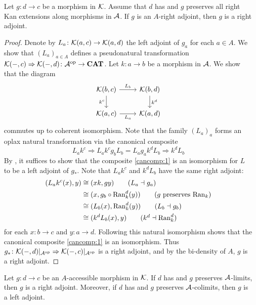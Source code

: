 \begin{theorem}\label{thm:LiftingOfAdjoint}
     Let $g\colon d\to c$ be a morphism in $\mathcal{K}$. Assume that $d$ has and $g$ preserves all right Kan extensions along morphisms in $\mathcal{A}$. If $g$ is an $A$-right adjoint, then $g$ is a right adjoint.
\end{theorem}
\begin{proof}
    Denote by $L_a\colon \mathcal{K}(a,c)\to \mathcal{K}(a,d)$ the left adjoint of $g_a$ for each $a\in A$. We show that $(L_a)_{a\in A}$ defines a pseudonatural transformation $\mathcal{K}(-,c)\Rightarrow \mathcal{K}(-,d)\colon \mathcal{A}^{\mathrm{op}}\to \mathbf{CAT}$. Let $k\colon a\to b$ be a morphism in $\mathcal{A}$. We show that the diagram
\[
\begin{tikzcd}
{\K(b,c)} \arrow[d, "k^c"'] \arrow[r, "L_b"] & {\K(b,d)} \arrow[d, "k^d"] \\
{\K(a,c)} \arrow[r, "L_a"']                  & {\K(a,d)}
\end{tikzcd}
\]
commutes up to coherent isomorphism. Note that the family $(L_a)_a$ forms an oplax natural transformation via the canonical composite
\begin{equation}\label{cancomp:1}
L_ak^c\Rightarrow L_ak^cg_bL_b = L_ag_ak^dL_b\Rightarrow k^dL_b
\end{equation}
By \cite[Proposition~2.35]{houstonLinearLogicUnits2013}, it suffices to show that the composite \eqref{cancomp:1} is an isomorphism for $L$ to be a left adjoint of $g_*$. Note that $L_ak^c$ and $k^dL_b$ have the same right adjoint:
\begin{align*}
    (L_ak^c(x),y) &\cong (xk,gy)\tag{$L_a\dashv g_a$}\\
    &\cong (x, g_b\circ \Ran_k^d(y))\tag{$g$ preserves $\Ran_k$}\\
    &\cong (L_b(x),\Ran_k^d(y)) \tag{$L_b\dashv g_b$}\\
    &\cong (k^dL_b(x),y)    \tag{$k^d\dashv \Ran_k^d$}
\end{align*}
for each $x\colon b\to c$ and $y\colon a\to d$. Following this natural isomorphism shows that the canonical composite \eqref{cancomp:1} is an isomorphism. Thus $g_*\colon \mathcal{K}(-,d)|_{\mathcal{A}^{\mathrm{op}}}\Rightarrow\mathcal{K}(-,c)|_{\mathcal{A}^{\mathrm{op}}}$ is a right adjoint, and by the bi-density of $A$, $g$ is a right adjoint.
\end{proof}
\begin{corollary}\label{cor:2-categoricalAAFT}
    Let $g\colon d\to c$ be an $A$-accessible morphism in $\mathcal{K}$. If $d$ has and $g$ preserves $\mathcal{A}$-limits, then $g$ is a right adjoint. Moreover, if $d$ has and $g$ preserves $\mathcal{A}$-colimits, then $g$ is a left adjoint.
\end{corollary}
